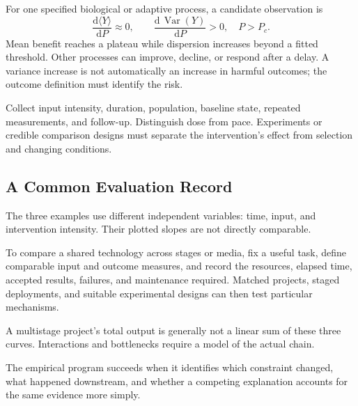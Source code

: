 For one specified biological or adaptive process, a candidate observation is
\begin{equation}
 \frac{\mathrm d\langle Y\rangle}{\mathrm dP}\approx0,
 \qquad
 \frac{\mathrm d\,\operatorname{Var}(Y)}{\mathrm dP}>0,
 \quad P>P_c.
\end{equation}
Mean benefit reaches a plateau while dispersion increases beyond a fitted threshold. Other processes can improve, decline, or respond after a delay. A variance increase is not automatically an increase in harmful outcomes; the outcome definition must identify the risk.

Collect input intensity, duration, population, baseline state, repeated measurements, and follow-up. Distinguish dose from pace. Experiments or credible comparison designs must separate the intervention's effect from selection and changing conditions.

\subsection{A Common Evaluation Record}

The three examples use different independent variables: time, input, and intervention intensity. Their plotted slopes are not directly comparable.

To compare a shared technology across stages or media, fix a useful task, define comparable input and outcome measures, and record the resources, elapsed time, accepted results, failures, and maintenance required. Matched projects, staged deployments, and suitable experimental designs can then test particular mechanisms.

A multistage project's total output is generally not a linear sum of these three curves. Interactions and bottlenecks require a model of the actual chain.

The empirical program succeeds when it identifies which constraint changed, what happened downstream, and whether a competing explanation accounts for the same evidence more simply.
